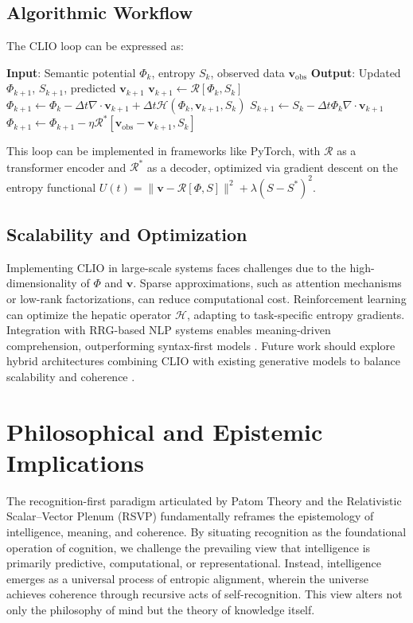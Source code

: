 \documentclass[11pt]{article}
\begin{document}
\subsection{Algorithmic Workflow}
The CLIO loop can be expressed as:
\begin{algorithmic}
\State \textbf{Input}: Semantic potential $\Phi_k$, entropy $S_k$, observed data $\mathbf{v}_{\text{obs}}$
\State \textbf{Output}: Updated $\Phi_{k+1}$, $S_{k+1}$, predicted $\mathbf{v}_{k+1}$
    \State $\mathbf{v}_{k+1} \gets \mathcal{R}[\Phi_k, S_k]$ 
    \State $\Phi_{k+1} \gets \Phi_k - \Delta t \nabla \cdot \mathbf{v}_{k+1} + \Delta t \mathcal{H}(\Phi_k, \mathbf{v}_{k+1}, S_k)$ 
    \State $S_{k+1} \gets S_k - \Delta t \Phi_k \nabla \cdot \mathbf{v}_{k+1}$ 
    \State $\Phi_{k+1} \gets \Phi_{k+1} - \eta \mathcal{R}^\ast [\mathbf{v}_{\text{obs}} - \mathbf{v}_{k+1}, S_k]$ 
\EndWhile
\end{algorithmic}
This loop can be implemented in frameworks like PyTorch, with $\mathcal{R}$ as a transformer encoder and $\mathcal{R}^\ast$ as a decoder, optimized via gradient descent on the entropy functional $U(t) = \|\mathbf{v} - \mathcal{R}[\Phi, S]\|^2 + \lambda (S - S^\ast)^2$.

\subsection{Scalability and Optimization}
Implementing CLIO in large-scale systems faces challenges due to the high-dimensionality of $\Phi$ and $\mathbf{v}$. Sparse approximations, such as attention mechanisms or low-rank factorizations, can reduce computational cost. Reinforcement learning can optimize the hepatic operator $\mathcal{H}$, adapting to task-specific entropy gradients. Integration with RRG-based NLP systems enables meaning-driven comprehension, outperforming syntax-first models \citep{ball2019superglue, ball2017babitasks}. Future work should explore hybrid architectures combining CLIO with existing generative models to balance scalability and coherence \citep{pinker2005computational}.

\section{Philosophical and Epistemic Implications}
The recognition-first paradigm articulated by Patom Theory and the Relativistic Scalar--Vector Plenum (RSVP) fundamentally reframes the epistemology of intelligence, meaning, and coherence. By situating recognition as the foundational operation of cognition, we challenge the prevailing view that intelligence is primarily predictive, computational, or representational. Instead, intelligence emerges as a universal process of entropic alignment, wherein the universe achieves coherence through recursive acts of self-recognition. This view alters not only the philosophy of mind but the theory of knowledge itself.
\end{document}

